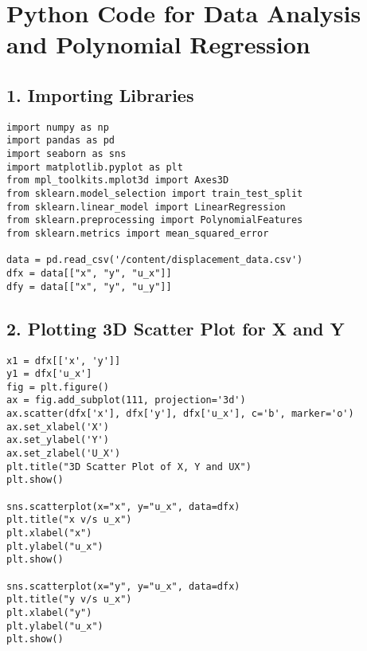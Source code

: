 \documentclass{article}
\begin{document}
\section*{Python Code for Data Analysis and Polynomial Regression}

\subsection*{1. Importing Libraries}
\begin{lstlisting}[style=python]
import numpy as np
import pandas as pd
import seaborn as sns
import matplotlib.pyplot as plt
from mpl_toolkits.mplot3d import Axes3D
from sklearn.model_selection import train_test_split
from sklearn.linear_model import LinearRegression
from sklearn.preprocessing import PolynomialFeatures
from sklearn.metrics import mean_squared_error

data = pd.read_csv('/content/displacement_data.csv')
dfx = data[["x", "y", "u_x"]]
dfy = data[["x", "y", "u_y"]]
\end{lstlisting}

\subsection*{2. Plotting 3D Scatter Plot for X and Y}
\begin{lstlisting}[style=python]
x1 = dfx[['x', 'y']]
y1 = dfx['u_x']
fig = plt.figure()
ax = fig.add_subplot(111, projection='3d')
ax.scatter(dfx['x'], dfx['y'], dfx['u_x'], c='b', marker='o')
ax.set_xlabel('X')
ax.set_ylabel('Y')
ax.set_zlabel('U_X')
plt.title("3D Scatter Plot of X, Y and UX")
plt.show()

sns.scatterplot(x="x", y="u_x", data=dfx)
plt.title("x v/s u_x")
plt.xlabel("x")
plt.ylabel("u_x")
plt.show()

sns.scatterplot(x="y", y="u_x", data=dfx)
plt.title("y v/s u_x")
plt.xlabel("y")
plt.ylabel("u_x")
plt.show()
\end{lstlisting}
\end{document}
